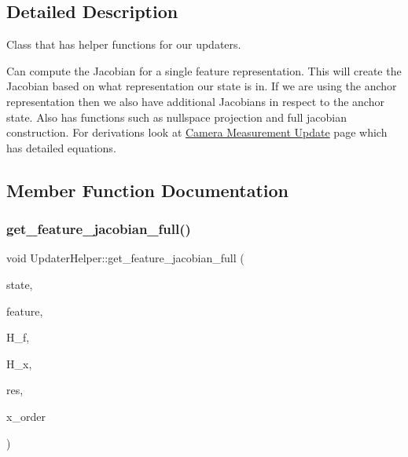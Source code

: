 \subsection{Detailed Description}
Class that has helper functions for our updaters. 

Can compute the Jacobian for a single feature representation. This will create the Jacobian based on what representation our state is in. If we are using the anchor representation then we also have additional Jacobians in respect to the anchor state. Also has functions such as nullspace projection and full jacobian construction. For derivations look at \hyperlink{update-feat}{Camera Measurement Update} page which has detailed equations. 

\subsection{Member Function Documentation}
\mbox{\label{classov__msckf_1_1UpdaterHelper_a83ba71455395ed13bbd15eb9134a6075}} 
\subsubsection{\texorpdfstring{get\+\_\+feature\+\_\+jacobian\+\_\+full()}{get\_feature\_jacobian\_full()}}
{\footnotesize\ttfamily void Updater\+Helper\+::get\+\_\+feature\+\_\+jacobian\+\_\+full (\begin{DoxyParamCaption}\item[{std\+::shared\+\_\+ptr$<$ \hyperlink{classov__msckf_1_1State}{State} $>$}]{state,  }\item[{\hyperlink{structov__msckf_1_1UpdaterHelper_1_1UpdaterHelperFeature}{Updater\+Helper\+Feature} \&}]{feature,  }\item[{Eigen\+::\+Matrix\+Xd \&}]{H\+\_\+f,  }\item[{Eigen\+::\+Matrix\+Xd \&}]{H\+\_\+x,  }\item[{Eigen\+::\+Vector\+Xd \&}]{res,  }\item[{std\+::vector$<$ std\+::shared\+\_\+ptr$<$ \hyperlink{classov__type_1_1Type}{ov\+\_\+type\+::\+Type} $>$$>$ \&}]{x\+\_\+order }\end{DoxyParamCaption})\hspace{0.3cm}{\ttfamily [static]}}



